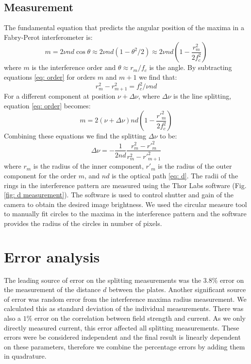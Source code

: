 \documentclass[11pt]{article}
\begin{document}
\subsection{Measurement} \label{sec: measuremet}
The fundamental equation that predicts the angular position of the maxima in a Fabry-Perot interferometer is:
\begin{equation}
    m = 2 \nu n d \cos{\theta} 
    \approx 2 \nu n d (1 - \theta^2/2)
    \approx 2 \nu n d (1 - \frac{r^2_m}{2f^2_c})
    \label{eq: order}
\end{equation}
where $m$ is the interference order and $\theta  \approx r_m/f_c$ is the angle. By subtracting equations \eqref{eq: order} for orders $m$ and $m + 1$ we find that: 
\begin{equation}
    r^2_m - r^2_{m+1} = f^2_c/\nu n d
\end{equation}
For a different component at position  $\nu + \Delta \nu$, where $\Delta \nu$ is the line splitting, equation \eqref{eq: order} becomes: 
\begin{equation}
    m = 2 (\nu + \Delta \nu) n d (1 - \frac{r'^2_m}{2f^2_c})
\end{equation}
Combining these equations we find the splitting $\Delta \nu$ to be: 
\begin{equation}
    \Delta \nu = - \frac{1}{2nd} \frac{r^2_m - r'^2_m}{r^2_m - r'^2_{m+1}}
    \label{eq: nu measurement}
\end{equation}
where $r_m$ is the radius of the inner component, $r'_m$ is the radius of the outer component for the order $m$, and $nd$ is the optical path \eqref{eq: d}. The radii of the rings in the interference pattern are measured using the Thor Labs software (Fig. \ref{fig: d measurement}). The software is used to control shutter and gain of the camera to obtain the desired image brightness. We used the circular measure tool to manually fit circles to the maxima in the interference pattern and the software provides the radius of the circles in number of pixels. 



\section{Error analysis} \label{sec: err}
The leading source of error on the splitting measurements was the $3.8\%$ error on the measurement of the distance $d$ between the plates. Another significant source of error was random error from the interference maxima radius measurement. We calculated this as standard deviation of the individual measurements. There was also a $1\%$ error on the correlation between field strength and current. As we only directly measured current, this error affected all splitting measurements. These errors were be considered independent and the final result is linearly dependent on these parameters, therefore we combine the percentage errors by adding them in quadrature.
\end{document}
